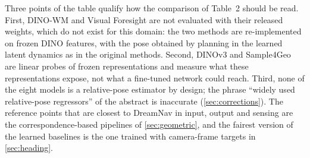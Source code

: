 Three points of the table qualify how the comparison of Table~2 should be read. First, DINO-WM and Visual Foresight are not evaluated with their released weights, which do not exist for this domain: the two methods are re-implemented on frozen DINO features, with the pose obtained by planning in the learned latent dynamics as in the original methods. Second, DINOv3 and Sample4Geo are linear probes of frozen representations and measure what these representations expose, not what a fine-tuned network could reach. Third, none of the eight models is a relative-pose estimator by design; the phrase ``widely used relative-pose regressors'' of the abstract is inaccurate (\cref{sec:corrections}). The reference points that are closest to DreamNav in input, output and sensing are the correspondence-based pipelines of \cref{sec:geometric}, and the fairest version of the learned baselines is the one trained with camera-frame targets in \cref{sec:heading}.
